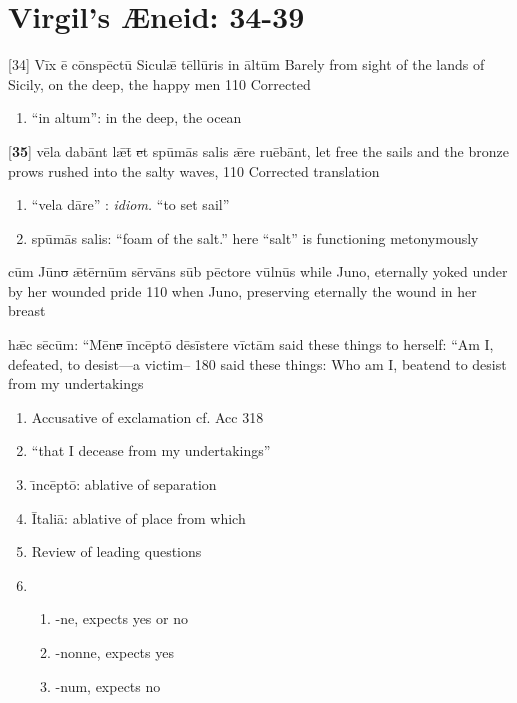 \section{Virgil's {\AE}neid:  34-39} %

\latline
  {[34] V\=ix \={\macron e} c\={\macron o}nsp\=ect\={\macron u} S\-ic\-ul\={\ae} t\=ell\={\macron u}r\-is \-in \=alt\=um }
  {Barely from sight of the lands of Sicily, on the deep, the happy men}
  {110} %
  {Corrected}
  {
	\begin{enumerate}
		\item ``in altum'':  in the deep, the ocean
	\end{enumerate}
  }

\latline
  {[\textbf{35}] v\={\macron e}l\-a d\-ab\=ant l\={\ae}t\={\macron{\i}}\sout{ e}t sp\={\macron u}m\={\macron a}s s\-al\-is \={\ae}r\-e r\-u\={\macron e}b\=ant,}
  {let free the sails and the bronze prows rushed into the salty waves,  }
  {110} %
  {Corrected translation}
  {
	\begin{enumerate}
		\item ``vela d\={a}re'' :  \emph{idiom.} ``to set sail''
		\item sp\={u}m\={a}s salis:  ``foam of the salt.''  here ``salt'' is functioning metonymously
	\end{enumerate}
  }

\latline
  {c\=um J\={\macron u}n\sout{o }\={\ae}t\=ern\=um s\=erv\={\macron a}ns s\=ub p\=ect\-or\-e v\=uln\={\macron u}s}
  {while Juno, eternally yoked under by her wounded pride}
  {110} %
  {when Juno, preserving eternally the wound in her breast}
  {
  }


\latline
  {h\={\ae}c s\={\macron e}c\=um:  ``M\={\macron e}n\sout{e }\=inc\=ept\={\macron o} d\={\macron e}s\=ist\-er\-e v\=ict\=am}
  {said these things to herself:  ``Am I, defeated, to desist---a victim--}
  {180} %
  {said these things:  Who am I, beatend to desist from my undertakings}
  {
	\begin{enumerate}
		\item Accusative of exclamation cf. Acc 318
		\item ``that I decease from my undertakings''
		\item \={\i}nc\={e}pt\={o}:  ablative of separation
		\item \={I}tali\={a}:  ablative of place from which
		\item Review of leading questions
		\item \begin{enumerate}
			\item -ne, expects yes or no
			\item -nonne, expects yes
			\item -num, expects no
		\end{enumerate}
	\end{enumerate}
  }

